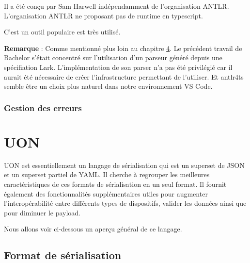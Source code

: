 \documentclass[
    iict, %
    il, %
]{heig-tb}
\begin{document}
Il a été conçu par Sam Harwell indépendamment de l'organisation ANTLR.
L'organisation ANTLR ne proposant pas de runtime en typescript. %



C'est un outil populaire est très utilisé.

\textbf{Remarque} :
Comme mentionné plus loin au chapitre \hyperref[grammar scope]{4}. Le précédent travail de Bachelor s'était concentré sur l'utilisation d'un parseur généré depuis une spécifiation Lark.
L'implémentation de son parser n'a pas été privilégié car il aurait été nécessaire de créer l'infrastructure permettant de l'utiliser.
Et antlr4ts semble être un choix plus naturel dans notre environnement VS Code.


\subsubsection{Gestion des erreurs}


\section{UON}
UON est essentiellement un langage de sérialisation qui est un superset de JSON et un superset partiel de YAML.
Il cherche à regrouper les meilleures caractéristiques de ces formats de sérialisation en un seul format.
Il fournit également des fonctionnalités supplémentaires utiles pour augmenter l'interopérabilité entre différents types de dispositifs, valider les données ainsi que pour diminuer le payload.

Nous allons voir ci-dessous un aperçu général de ce langage.

\subsection{Format de sérialisation}
\end{document}
